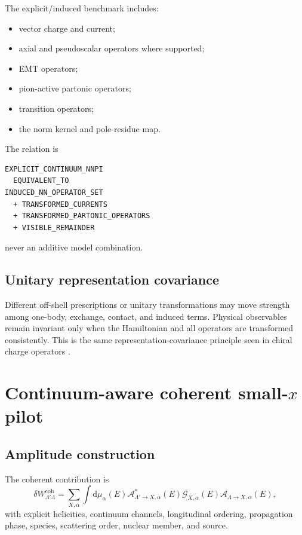 \documentclass[11pt]{article}
\newcommand{\dd}{\mathrm{d}}
\begin{document}
The explicit/induced benchmark includes:
\begin{itemize}
\item vector charge and current;
\item axial and pseudoscalar operators where supported;
\item EMT operators;
\item pion-active partonic operators;
\item transition operators;
\item the norm kernel and pole-residue map.
\end{itemize}
The relation is
\begin{verbatim}
EXPLICIT_CONTINUUM_NNPI
  EQUIVALENT_TO
INDUCED_NN_OPERATOR_SET
  + TRANSFORMED_CURRENTS
  + TRANSFORMED_PARTONIC_OPERATORS
  + VISIBLE_REMAINDER
\end{verbatim}
never an additive model combination.

\subsection{Unitary representation covariance}

Different off-shell prescriptions or unitary transformations may move strength
among one-body, exchange, contact, and induced terms.  Physical observables
remain invariant only when the Hamiltonian and all operators are transformed
consistently.  This is the same representation-covariance principle seen in
chiral charge operators \cite{Pastore2011}.

\section{Continuum-aware coherent small-\texorpdfstring{\(x\)}{x} pilot}
\label{sec:coherent}

\subsection{Amplitude construction}

The coherent contribution is
\begin{equation}
 \delta W_{\Lambda'\Lambda}^{\mathrm{coh}}
 =
 \sum_{X,\alpha}
 \int\dd\mu_\alpha(E)
 \mathcal A_{\Lambda'\to X,\alpha}^{*}(E)
 \mathcal G_{X,\alpha}(E)
 \mathcal A_{\Lambda\to X,\alpha}(E),
 \label{eq:coherent-continuum}
\end{equation}
with explicit helicities, continuum channels, longitudinal ordering,
propagation phase, species, scattering order, nuclear member, and source.
\end{document}
